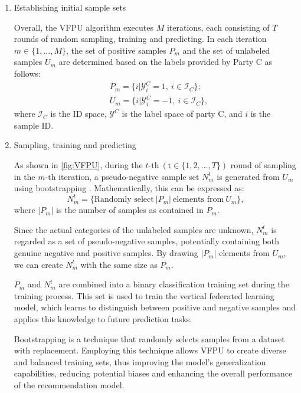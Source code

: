 \documentclass[10pt,journal,compsoc]{IEEEtran}
\begin{document}
\begin{enumerate}[label=(\arabic*)]
	\item Establishing initial sample sets
	
	Overall, the VFPU algorithm executes $M$ iterations, each consisting of $T$ rounds of random sampling, training and predicting.  In each iteration $m\in \{1,...,M\}$, the set of positive samples ${{P}_{m}}$ and the set of unlabeled samples ${{U}_{m}}$ are determined based on the labels provided by Party C as follows:
	\begin{equation}
		\begin{split}
			&{{P}_{m}}=\{i|\mathsf{\mathcal{Y}}_{i}^{C}=1,\ i\in {{\mathsf{\mathcal{I}}}_{C}}\};\\
			&{{U}_{m}}=\{i|\mathsf{\mathcal{Y}}_{i}^{C}=-1,\ i\in {{\mathsf{\mathcal{I}}}_{C}}\},
		\end{split}
	\end{equation}
	where ${{\mathsf{\mathcal{I}}}_{C}}$ is the ID space, ${{\mathsf{\mathcal{Y}}}^{C}}$ is the label space of party C, and $i$ is the sample ID.
	\item Sampling, training and predicting
	
	As shown in \autoref{fig:VFPU}, during the $t\text{-th} \ (\text{t}\in \{1,2,...,T\})$ round of sampling in the $m\text{-th}$ iteration, a pseudo-negative sample set $N_{m}^{t}$ is generated from ${{U}_{m}}$ using bootstrapping \cite{mordelet2014bagging}. Mathematically, this can be expressed as:
	\begin{equation}
		N_{m}^{t}=\{ \text{Randomly select} \ |P_{m}| \ \text{elements from} \ U_{m} \},
	\end{equation}
	where $|{{P}_{m}}|$ is the number of samples as contained in ${{P}_{m}}$.
	
	Since the actual categories of the unlabeled samples are unknown, $N_{m}^{t}$ is regarded as a set of pseudo-negative samples, potentially containing both genuine negative and positive samples. By drawing $|{{P}_{m}}|$ elements from ${{U}_{m}}$, we can create $N_{m}^{t}$ with the same size as ${{P}_{m}}$.
	
	${{P}_{m}}$ and $N_{m}^{t}$ are combined into a binary classification training set during the training process. This set is used to train the vertical federated learning model, which learns to distinguish between positive and negative samples and applies this knowledge to future prediction tasks. 
	
	Bootstrapping is a technique that randomly selects samples from a dataset with replacement. Employing this technique allows VFPU to create diverse and balanced training sets, thus improving the model's generalization capabilities, reducing potential biases and enhancing the overall performance of the recommendation model.
	

\end{enumerate}
\end{document}
